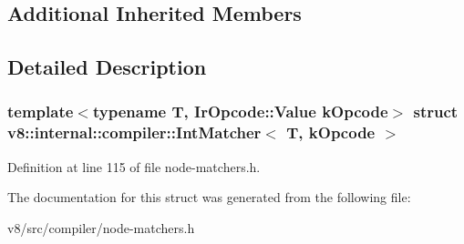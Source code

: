 \subsection*{Additional Inherited Members}


\subsection{Detailed Description}
\subsubsection*{template$<$typename T, Ir\+Opcode\+::\+Value k\+Opcode$>$\newline
struct v8\+::internal\+::compiler\+::\+Int\+Matcher$<$ T, k\+Opcode $>$}



Definition at line 115 of file node-\/matchers.\+h.



The documentation for this struct was generated from the following file\+:\begin{DoxyCompactItemize}
\item 
v8/src/compiler/node-\/matchers.\+h\end{DoxyCompactItemize}
